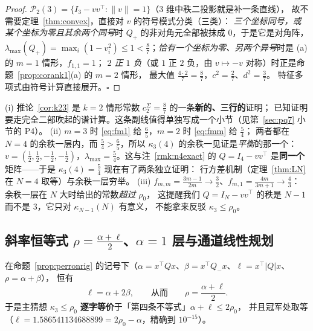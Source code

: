 \begin{proof}
$\mathcal P_2(3)=\{I_3-vv^\top:\|v\|=1\}$（$3$ 维中秩二投影就是补一条直线），
故不需要定理~\ref{thm:convex}，直接对 $v$ 的符号模式分类（三类）：
\emph{三个坐标同号，或某个坐标为零且其余两个同号}时 $Q_+$ 的非对角元全部被抹成 $0$，于是它是对角阵，
$\lambda_{\max}(Q_+)=\max_i(1-v_i^2)\le1<\frac87$；\emph{恰有一个坐标为零、另两个异号}时是 (a) 的 $m=1$ 情形，$f_{1,1}=1$；
\emph{$2$ 正 $1$ 负}（或 $1$ 正 $2$ 负，由 $v\mapsto-v$ 对称）时正是命题~\ref{prop:corank1}(a) 的 $m=2$ 情形，
最大值 $\frac{4\cdot2}{7}=\frac87$，$c^2=\frac27$、$d^2=\frac37$。
特征多项式由符号计算直接展开。$\square$
\end{proof}

\begin{remark}\label{rmk:k23read}
(i) 推论~\ref{cor:k23} 是 $k=2$ 情形常数 $c_2^\Sigma=\frac87$ 的一条\textbf{新的、三行的}证明；
已知证明要走完全二部吹起的谱计算。这条副线值得单独写成一个小节（见第~\ref{sec:pq7} 小节的 P4）。
(ii) $m=3$ 时 \eqref{eq:fm1} 给 $\frac65$，$m=2$ 时 \eqref{eq:fmm} 给 $\frac54$；
两者都在 $N=4$ 的余秩一层内，而 $\frac54>\frac65$，所以 $\kappa_3(4)$ 的余秩一见证是\emph{平衡}的那一个：
$v=(\frac12,\frac12,-\frac12,-\frac12)$，$\lambda_{\max}=\frac54$。这与注~\ref{rmk:n4exact} 的
$Q=I_4-vv^\top$ 是\textbf{同一个}矩阵——于是 $\kappa_3(4)=\frac54$ 现在有了两条独立证明：
行方差机制（定理~\ref{thm:LN} 在 $N=4$ 取等）与余秩一层穷举。
(iii) $f_{m,m}=\frac{3m-1}{2m}\to\frac32$、$f_{m,1}=\frac{4m}{3m+1}\to\frac43$：
余秩一层在 $N$ 大时给出的常数\emph{超过} $\rho_0$，
这提醒我们 $Q=I_N-vv^\top$ 的秩是 $N-1$ 而不是 $3$，它只对 $\kappa_{N-1}(N)$ 有意义，
不能拿来反驳 $\kappa_3\le\rho_0$。
\end{remark}

\subsection{斜率恒等式 $\rho=\frac{\alpha+\ell}2$、$\alpha=1$ 层与通道线性规划}\label{sec:slope1}

\begin{lemma}[斜率恒等式，已证]\label{lem:slope1}
在命题~\ref{prop:perronrig} 的记号下（$\alpha=x^\top Qx$、$\beta=x^\top Q_-x$、$\ell=x^\top|Q|x$、$\rho=\alpha+\beta$），
恒有
\begin{equation}\label{eq:slope1}
\ell=\alpha+2\beta,\qquad\text{从而}\qquad \rho=\frac{\alpha+\ell}2 .
\end{equation}
于是主猜想 $\kappa_3\le\rho_0$ \textbf{逐字等价}于「第四条不等式」$\alpha+\ell\le2\rho_0$，
并且冠军处取等（$\ell=1.586541134688899=2\rho_0-\alpha$，精确到 $10^{-15}$）。
\end{lemma}

